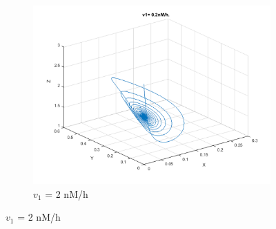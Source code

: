 \documentclass[10pt,a4paper,oneside,twocolumn]{article}
\numberwithin{equation}{section} %
\begin{document}
\begin{figure}
\begin{subfigure}[b]{0.32\textwidth}
	    \includegraphics[width=\textwidth]{LotsofthesameA/A-AA2.png}
	    \caption{$v_1$ = 2 nM/h}
	\end{subfigure}
	 

\end{figure}
\end{document}
